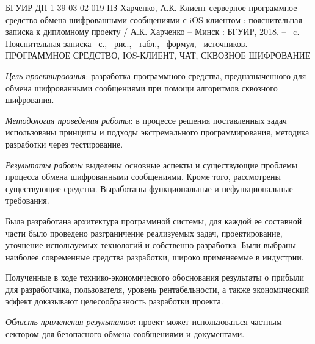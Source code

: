 \thispagestyle{empty}

\setcounter{page}{4}


БГУИР ДП 1-39 03 02 019 ПЗ
\bigbreak
Харченко, А.К. Клиент-серверное программное средство обмена шифрованными сообщениями с iOS-клиентом : пояснительная записка к дипломному проекту / А.К. Харченко -- Минск : БГУИР, 2018. -- \totalpages~c.
\bigbreak
Пояснительная записка \totalpages~с., \totfig{}~рис., \tottab{}~табл., \toteq{}~формул, \totref{}~источников.
\bigbreak
\MakeUppercase{Программное средство, iOS-клиент, чат, сквозное шифрование}
\bigbreak

\textit{Цель проектирования}: разработка программного средства, предназначенного для обмена шифрованными сообщениями при помощи алгоритмов сквозного шифрования. 

\textit{Методология проведения работы}: в процессе решения поставленных задач использованы принципы и подходы экстремального программирования, методика разработки через тестирование.

\textit{Результаты работы} выделены основные аспекты и существующие проблемы процесса обмена шифрованными сообщениями. Кроме того, рассмотрены существующие средства. Выработаны функциональные и нефункциональные требования.

Была разработана архитектура программной системы, для каждой ее составной части было проведено разграничение реализуемых задач, проектирование, уточнение используемых технологий и собственно разработка. Были выбраны наиболее современные средства разработки, широко применяемые в индустрии. 

Полученные в ходе технико-экономического обоснования результаты о прибыли для разработчика, пользователя, уровень рентабельности, а также экономический эффект доказывают целесообразность разработки про\-екта.

\textit{Область применения результатов}: проект может использоваться частным сектором для безопасного обмена сообщениями и документами.
